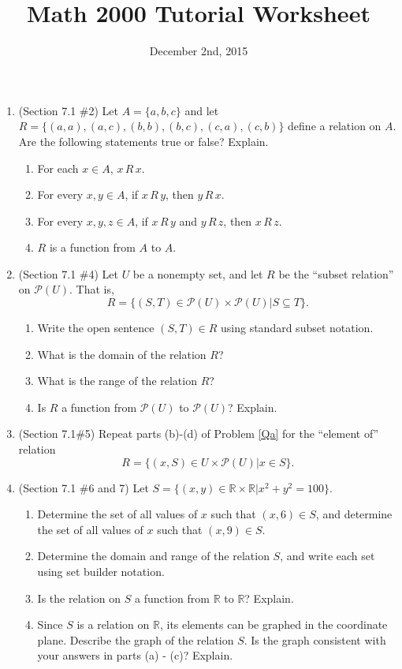 \documentclass[letterpaper,12pt]{article}
\title{Math 2000 Tutorial Worksheet}
\date{December 2nd, 2015}
\newcommand{\R}[2]{#1 \, R \, #2}
\renewcommand{\P}{\mathcal{P}}
\begin{document}
\maketitle

 \begin{enumerate}
  \item (Section 7.1 \#2) Let $A=\{a,b,c\}$ and let $R=\{(a,a), (a,c), (b,b), (b,c), (c,a), (c,b)\}$ define a relation on $A$. Are the following statements true or false? Explain.
\begin{enumerate}
 \item For each $x\in A$, $\R{x}{x}$.
 \item For every $x,y\in A$, if $\R{x}{y}$, then $\R{y}{x}$.
 \item For every $x,y,z\in A$, if $\R{x}{y}$ and $\R{y}{z}$, then $\R{x}{z}$.
 \item $R$ is a function from $A$ to $A$.
\end{enumerate}
 \item (Section 7.1 \#4) Let $U$ be a nonempty set, and let $R$ be the ``subset relation'' on $\mathcal{P}(U)$. That is,\label{Qa}
\[
 R = \{(S,T)\in \P(U)\times\P(U) | S\subseteq T\}.
\]
\begin{enumerate}
 \item Write the open sentence $(S,T)\in R$ using standard subset notation.
 \item What is the domain of the relation $R$?
 \item What is the range of the relation $R$?
 \item Is $R$ a function from $\P(U)$ to $\P(U)$? Explain.
\end{enumerate}
 \item (Section 7.1\#5) Repeat parts (b)-(d) of Problem \ref{Qa} for the ``element of'' relation
\[
 R = \{(x,S)\in U\times \P(U) | x\in S\}.
\]
\item (Section 7.1 \#6 and 7) Let $S = \{(x,y)\in \mathbb{R}\times \mathbb{R} | x^2+y^2=100\}$.
\begin{enumerate}
 \item Determine the set of all values of $x$ such that $(x,6)\in S$, and determine the set of all values of $x$ such that $(x,9)\in S$.
 \item Determine the domain and range of the relation $S$, and write each set using set builder notation.
 \item Is the relation on $S$ a function from $\mathbb{R}$ to $\mathbb{R}$? Explain.
 \item Since $S$ is a relation on $\mathbb{R}$, its elements can be graphed in the coordinate plane. Describe the graph of the relation $S$. Is the graph consistent with your answers in parts (a) - (c)? Explain.

\end{enumerate}
\end{enumerate}
\end{document}
